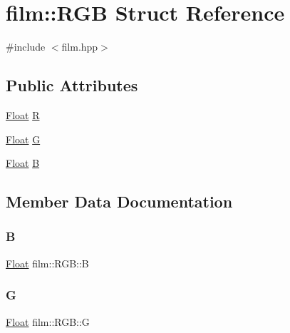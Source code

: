 \hypertarget{structfilm_1_1RGB}{}\section{film\+::R\+GB Struct Reference}
\label{structfilm_1_1RGB}


{\ttfamily \#include $<$film.\+hpp$>$}

\subsection*{Public Attributes}
\begin{DoxyCompactItemize}
\item 
\mbox{\hyperlink{cyclop_8hpp_a07afd7094cb489cbd514c76e6f55d34f}{Float}} \mbox{\hyperlink{structfilm_1_1RGB_a194e76e3c32f7aac8234387966f70f31}{R}}
\item 
\mbox{\hyperlink{cyclop_8hpp_a07afd7094cb489cbd514c76e6f55d34f}{Float}} \mbox{\hyperlink{structfilm_1_1RGB_a3709bbd87fac656c1bf8fbde86a90050}{G}}
\item 
\mbox{\hyperlink{cyclop_8hpp_a07afd7094cb489cbd514c76e6f55d34f}{Float}} \mbox{\hyperlink{structfilm_1_1RGB_a20cd7987c0561d86fba72d7ab874cd12}{B}}
\end{DoxyCompactItemize}


\subsection{Member Data Documentation}
\mbox{\label{structfilm_1_1RGB_a20cd7987c0561d86fba72d7ab874cd12}} 
\subsubsection{\texorpdfstring{B}{B}}
{\footnotesize\ttfamily \mbox{\hyperlink{cyclop_8hpp_a07afd7094cb489cbd514c76e6f55d34f}{Float}} film\+::\+R\+G\+B\+::B}

\mbox{\label{structfilm_1_1RGB_a3709bbd87fac656c1bf8fbde86a90050}} 
\subsubsection{\texorpdfstring{G}{G}}
{\footnotesize\ttfamily \mbox{\hyperlink{cyclop_8hpp_a07afd7094cb489cbd514c76e6f55d34f}{Float}} film\+::\+R\+G\+B\+::G}

